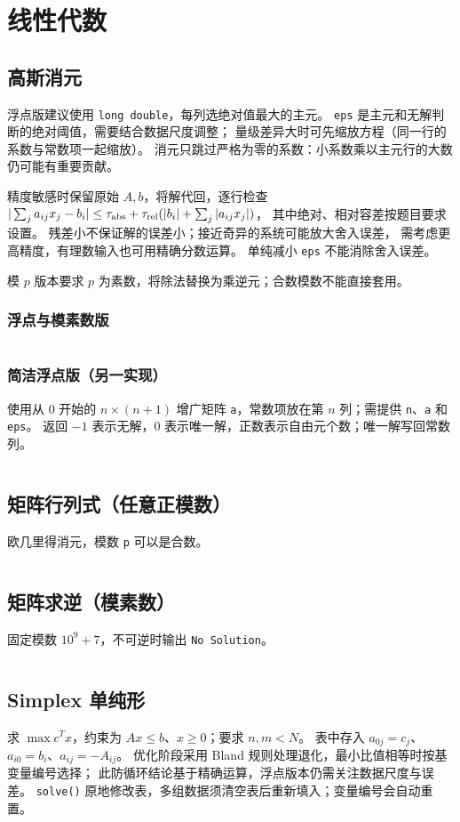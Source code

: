 \section{线性代数}
				\subsection{高斯消元}
					浮点版建议使用 \texttt{long double}，每列选绝对值最大的主元。
					\texttt{eps} 是主元和无解判断的绝对阈值，需要结合数据尺度调整；
					量级差异大时可先缩放方程（同一行的系数与常数项一起缩放）。
					消元只跳过严格为零的系数：小系数乘以主元行的大数仍可能有重要贡献。

					精度敏感时保留原始 $A,b$，将解代回，逐行检查
					$|\sum_j a_{ij}x_j-b_i| \le
					\tau_{\rm abs}+\tau_{\rm rel}(|b_i|+\sum_j|a_{ij}x_j|)$，
					其中绝对、相对容差按题目要求设置。
					残差小不保证解的误差小；接近奇异的系统可能放大舍入误差，
					需考虑更高精度，有理数输入也可用精确分数运算。
					单纯减小 \texttt{eps} 不能消除舍入误差。

					模 $p$ 版本要求 $p$ 为素数，将除法替换为乘逆元；合数模数不能直接套用。
					\subsubsection{浮点与模素数版}
					\inputminted{cpp}{sections/LinearAlgebra/assets/Math/高斯消元.cpp}
					\subsubsection{简洁浮点版（另一实现）}
					使用从 $0$ 开始的 $n\times(n+1)$ 增广矩阵 \texttt{a}，常数项放在第 $n$ 列；需提供 \texttt{n}、\texttt{a} 和 \texttt{eps}。
					返回 $-1$ 表示无解，$0$ 表示唯一解，正数表示自由元个数；唯一解写回常数列。
					\inputminted{cpp}{sections/LinearAlgebra/assets/Math/高斯消元-简洁版.cpp}
				\subsection{矩阵行列式（任意正模数）}
					欧几里得消元，模数 \texttt{p} 可以是合数。
					\inputminted{cpp}{sections/LinearAlgebra/assets/Math/矩阵求行列式.cpp}
				\subsection{矩阵求逆（模素数）}
					固定模数 $10^9+7$，不可逆时输出 \texttt{No Solution}。
					\inputminted{cpp}{sections/LinearAlgebra/assets/Math/矩阵求逆.cpp}
				\subsection{Simplex 单纯形}
					求 $\max c^Tx$，约束为 $Ax\le b$、$x\ge0$；要求 $n,m<N$。
					表中存入 $a_{0j}=c_j$、$a_{i0}=b_i$、$a_{ij}=-A_{ij}$。
					优化阶段采用 Bland 规则处理退化，最小比值相等时按基变量编号选择；
					此防循环结论基于精确运算，浮点版本仍需关注数据尺度与误差。
					\texttt{solve()} 原地修改表，多组数据须清空表后重新填入；变量编号会自动重置。
					\inputminted{cpp}{sections/LinearAlgebra/assets/Math/Simplex.cpp}
